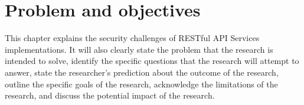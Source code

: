 \chapter{Problem and objectives}

This chapter explains the security challenges of RESTful API  Services implementations. It will also clearly state the problem that the research is intended to solve, identify the specific questions that the research will attempt to answer, state the researcher’s prediction about the outcome of the research, outline the specific goals of the research, acknowledge the limitations of the research, and discuss the potential impact of the research.
